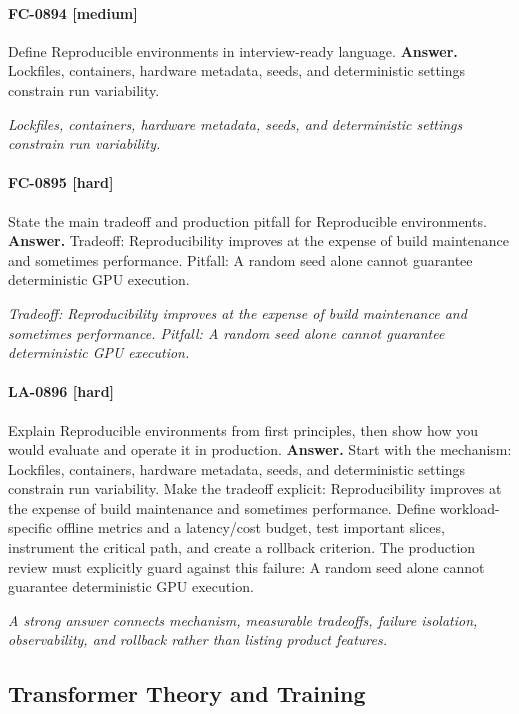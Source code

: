 \paragraph{FC-0894 [medium]} Define Reproducible environments in interview-ready language.
\noindent\textbf{Answer.} Lockfiles, containers, hardware metadata, seeds, and deterministic settings constrain run variability.
\par\textit{Lockfiles, containers, hardware metadata, seeds, and deterministic settings constrain run variability.}
\paragraph{FC-0895 [hard]} State the main tradeoff and production pitfall for Reproducible environments.
\noindent\textbf{Answer.} Tradeoff: Reproducibility improves at the expense of build maintenance and sometimes performance. Pitfall: A random seed alone cannot guarantee deterministic GPU execution.
\par\textit{Tradeoff: Reproducibility improves at the expense of build maintenance and sometimes performance. Pitfall: A random seed alone cannot guarantee deterministic GPU execution.}
\paragraph{LA-0896 [hard]} Explain Reproducible environments from first principles, then show how you would evaluate and operate it in production.
\noindent\textbf{Answer.} Start with the mechanism: Lockfiles, containers, hardware metadata, seeds, and deterministic settings constrain run variability. Make the tradeoff explicit: Reproducibility improves at the expense of build maintenance and sometimes performance. Define workload-specific offline metrics and a latency/cost budget, test important slices, instrument the critical path, and create a rollback criterion. The production review must explicitly guard against this failure: A random seed alone cannot guarantee deterministic GPU execution.
\par\textit{A strong answer connects mechanism, measurable tradeoffs, failure isolation, observability, and rollback rather than listing product features.}
\subsection{Transformer Theory and Training}
